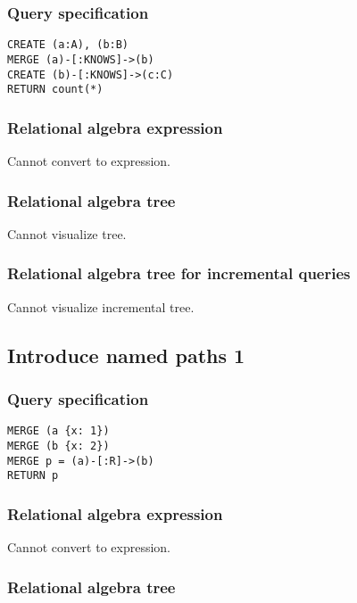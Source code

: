 \subsubsection*{Query specification}

\begin{lstlisting}
CREATE (a:A), (b:B)
MERGE (a)-[:KNOWS]->(b)
CREATE (b)-[:KNOWS]->(c:C)
RETURN count(*)
\end{lstlisting}

\subsubsection*{Relational algebra expression}

Cannot convert to expression.

\subsubsection*{Relational algebra tree}

Cannot visualize tree.

\subsubsection*{Relational algebra tree for incremental queries}

Cannot visualize incremental tree.

\subsection{Introduce named paths 1}

\subsubsection*{Query specification}

\begin{lstlisting}
MERGE (a {x: 1})
MERGE (b {x: 2})
MERGE p = (a)-[:R]->(b)
RETURN p
\end{lstlisting}

\subsubsection*{Relational algebra expression}

Cannot convert to expression.

\subsubsection*{Relational algebra tree}


